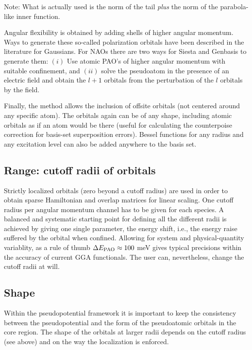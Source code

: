 \documentclass[11pt]{article}
\begin{document}
Note: What is actually used is the norm of the tail {\em plus} the
norm of the parabola-like inner function.

  Angular flexibility is obtained by adding shells of higher angular 
momentum.
  Ways to generate these so-called polarization orbitals have been
described in the literature for Gaussians. 
  For NAOs there are two ways for {\sc Siesta} and {\sc Genbasis} to
generate them: $(i)$ Use atomic PAO's of higher angular momentum with
suitable confinement, and $(ii)$ solve the pseudoatom in the presence
of an electric field and obtain the $l+1$ orbitals from the perturbation
of the $l$ orbitals by the field.

  Finally, the method allows the inclusion of offsite orbitals (not centered
around any specific atom). The orbitals again can be of any shape, including
atomic orbitals as if an atom would be there (useful for calculating the
counterpoise correction for basis-set superposition errors). 
Bessel functions for any radius and any excitation level can also be 
added anywhere to the basis set.

\subsection{Range: cutoff radii of orbitals}

  Strictly localized orbitals (zero beyond a cutoff radius) are used
in order to obtain sparse Hamiltonian and overlap matrices for linear 
scaling. One cutoff radius per angular momentum channel has to be
given for each species. 
  A balanced and systematic starting point for defining all the different 
radii is achieved by giving one single parameter, the energy shift, i.e., 
the energy raise suffered by the orbital when confined.
Allowing for system and physical-quantity variablity, as a rule of thumb
$\Delta E_{\small \rm PAO} \approx 100$ meV gives 
typical precisions within the accuracy of current GGA functionals.
The user can, nevertheless, change the cutoff radii at will.

\subsection{Shape}

  Within the pseudopotential framework it is important to keep 
the consistency between the pseudopotential and
the form of the pseudoatomic orbitals in the core region.
  The shape of the orbitals at larger radii depends on the
cutoff radius (see above) and on the way the localization 
is enforced.
\end{document}
